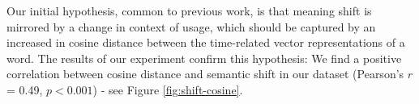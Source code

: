 

Our initial hypothesis, common to previous work, is that meaning shift
is mirrored by a change in context of usage, which should be captured
by an increased in cosine distance between the time-related vector
representations of a word. The results of our experiment confirm this
hypothesis: We find a positive correlation between cosine distance and
semantic shift in our dataset (Pearson's $r$= 0.49, $p<0.001$) - see 
Figure \ref{fig:shift-cosine}.

